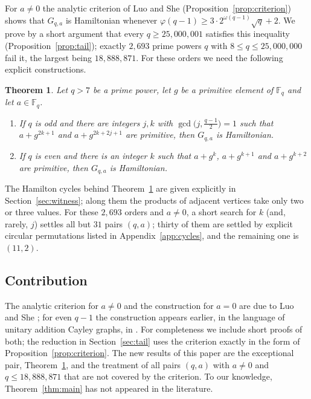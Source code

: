 \documentclass{amsart}
\newtheorem{theorem}{Theorem}[section]
\theoremstyle{remark}
\numberwithin{equation}{section}
\numberwithin{table}{section}
\newcommand{\F}{\mathbb{F}}
\begin{document}
For $a\neq0$ the analytic criterion of Luo and She (Proposition~\ref{prop:criterion}) shows that $G_{q,a}$ is Hamiltonian whenever $\varphi(q-1)\ge 3\cdot 2^{\omega(q-1)}\sqrt q+2$. We prove by a short argument that every $q\ge 25{,}000{,}001$ satisfies this inequality (Proposition~\ref{prop:tail}); exactly $2{,}693$ prime powers $q$ with $8\le q\le 25{,}000{,}000$ fail it, the largest being $18{,}888{,}871$. For these orders we need the following explicit constructions.

\begin{theorem}\label{thm:witness}
Let $q>7$ be a prime power, let $g$ be a primitive element of $\F_q$ and let $a\in\F_q$.
\begin{enumerate}
\item If $q$ is odd and there are integers $j,k$ with $\gcd\bigl(j,\tfrac{q-1}{2}\bigr)=1$ such that $a+g^{2k+1}$ and $a+g^{2k+2j+1}$ are primitive, then $G_{q,a}$ is Hamiltonian.
\item If $q$ is even and there is an integer $k$ such that $a+g^{k}$, $a+g^{k+1}$ and $a+g^{k+2}$ are primitive, then $G_{q,a}$ is Hamiltonian.
\end{enumerate}
\end{theorem}

The Hamilton cycles behind Theorem~\ref{thm:witness} are given explicitly in Section~\ref{sec:witness}; along them the products of adjacent vertices take only two or three values. For these $2{,}693$ orders and $a\neq0$, a short search for $k$ (and, rarely, $j$) settles all but $31$ pairs $(q,a)$; thirty of them are settled by explicit circular permutations listed in Appendix~\ref{app:cycles}, and the remaining one is $(11,2)$.

\subsection*{Contribution}
The analytic criterion for $a\neq0$ and the construction for $a=0$ are due to Luo and She \cite{LS}; for even $q-1$ the construction appears earlier, in the language of unitary addition Cayley graphs, in \cite[Theorem~11(i)]{SGS}. For completeness we include short proofs of both; the reduction in Section~\ref{sec:tail} uses the criterion exactly in the form of Proposition~\ref{prop:criterion}. The new results of this paper are the exceptional pair, Theorem~\ref{thm:witness}, and the treatment of all pairs $(q,a)$ with $a\neq0$ and $q\le 18{,}888{,}871$ that are not covered by the criterion. To our knowledge, Theorem~\ref{thm:main} has not appeared in the literature.
\end{document}
